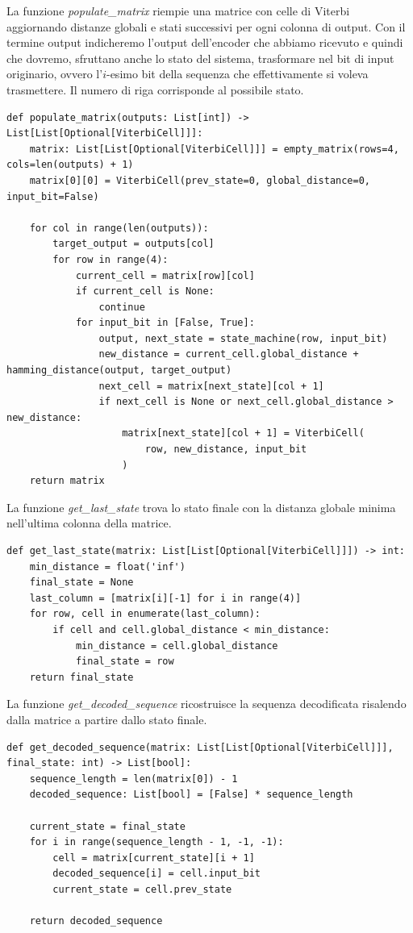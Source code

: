La funzione \textit{populate\_matrix} riempie una matrice con celle di Viterbi aggiornando distanze globali e stati successivi per ogni colonna di output. Con il termine output indicheremo l'output dell'encoder che abbiamo ricevuto e quindi che dovremo, sfruttano anche lo stato del sistema, trasformare nel bit di input originario, ovvero l'$i$-esimo bit della sequenza che effettivamente si voleva trasmettere. Il numero di riga corrisponde al possibile stato.
\begin{verbatim}
def populate_matrix(outputs: List[int]) -> List[List[Optional[ViterbiCell]]]:
    matrix: List[List[Optional[ViterbiCell]]] = empty_matrix(rows=4, cols=len(outputs) + 1)
    matrix[0][0] = ViterbiCell(prev_state=0, global_distance=0, input_bit=False)

    for col in range(len(outputs)):
        target_output = outputs[col]
        for row in range(4):
            current_cell = matrix[row][col]
            if current_cell is None:
                continue
            for input_bit in [False, True]:
                output, next_state = state_machine(row, input_bit)
                new_distance = current_cell.global_distance + hamming_distance(output, target_output)
                next_cell = matrix[next_state][col + 1]
                if next_cell is None or next_cell.global_distance > new_distance:
                    matrix[next_state][col + 1] = ViterbiCell(
                        row, new_distance, input_bit
                    )
    return matrix
\end{verbatim}

La funzione \textit{get\_last\_state} trova lo stato finale con la distanza globale minima nell'ultima colonna della matrice.
\begin{verbatim}
def get_last_state(matrix: List[List[Optional[ViterbiCell]]]) -> int:
    min_distance = float('inf')
    final_state = None
    last_column = [matrix[i][-1] for i in range(4)]
    for row, cell in enumerate(last_column):
        if cell and cell.global_distance < min_distance:
            min_distance = cell.global_distance
            final_state = row
    return final_state
\end{verbatim}
La funzione \textit{get\_decoded\_sequence} ricostruisce la sequenza decodificata risalendo dalla matrice a partire dallo stato finale.
\begin{verbatim}
def get_decoded_sequence(matrix: List[List[Optional[ViterbiCell]]], final_state: int) -> List[bool]:
    sequence_length = len(matrix[0]) - 1
    decoded_sequence: List[bool] = [False] * sequence_length
    
    current_state = final_state
    for i in range(sequence_length - 1, -1, -1):
        cell = matrix[current_state][i + 1]
        decoded_sequence[i] = cell.input_bit
        current_state = cell.prev_state

    return decoded_sequence
\end{verbatim}



